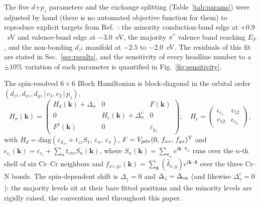 \documentclass[preprint,12pt]{elsarticle}
\begin{document}
The five $d$+$p_z$ parameters and the exchange splitting (Table~\ref{tab:params}) were adjusted
by hand (there is no automated objective function for them) to reproduce explicit targets
from Ref.~\cite{Kuklin2017}: the minority conduction-band edge at $+0.9$~eV
and valence-band edge at $-3.0$~eV, the majority $\pi^*$ valence band reaching $E_F$, and the non-bonding $d_{z^2}$ manifold at
$-2.5$ to $-2.0$~eV. The residuals of this fit are stated in Sec.~\ref{sec:results}, and
the sensitivity of every headline number to a $\pm10\%$ variation of each parameter is
quantified in Fig.~\ref{fig:sensitivity}.

The spin-resolved $6\times6$ Bloch Hamiltonian is block-diagonal in the orbital order
$(d_{z^2},d_{xz},d_{yz}\,|\,c_1,c_2\,|\,p_z)$,
\begin{equation}
H_\sigma(\mathbf{k})=
\begin{pmatrix}
H_d(\mathbf{k})+\Delta_\sigma & 0 & F(\mathbf{k})\\
0 & H_c(\mathbf{k})+\Delta^c_\sigma & 0\\
F^\dagger(\mathbf{k}) & 0 & \varepsilon_{p_z}
\end{pmatrix},\quad
H_c=\begin{pmatrix}\epsilon_{c_1} & v_{12}\\ v_{12} & \epsilon_{c_2}\end{pmatrix},
\label{eq:H}
\end{equation}
with $H_d=\mathrm{diag}(\varepsilon_{d_{z^2}}+t_{zz}S_1,\,\varepsilon_\pi,\,\varepsilon_\pi)$,
$F=V_{pd\pi}(0,\,f_{xz},\,f_{yz})^{\rm T}$ and
$\epsilon_{c_i}(\mathbf{k})=\varepsilon_{c_i}+\sum_n t_{cin}S_n(\mathbf{k})$, where
$S_n(\mathbf{k})=\sum_{\boldsymbol\tau_n}e^{i\mathbf{k}\cdot\boldsymbol\tau_n}$ runs over
the $n$-th shell of six Cr--Cr neighbors and
$f_{xz,yz}(\mathbf{k})=\sum_{\boldsymbol\delta}(\hat\delta_{x,y})
e^{i\mathbf{k}\cdot\boldsymbol\delta}$ over the three Cr--N bonds. The spin-dependent shift is
$\Delta_\uparrow=0$ and $\Delta_\downarrow=\Delta_{\rm ex}$ (and likewise
$\Delta^c_\uparrow=0$): the majority levels sit at their bare fitted positions and the minority
levels are rigidly raised, the convention used throughout this paper.
\end{document}
